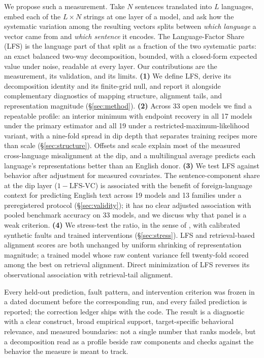 \documentclass{article} %
\begin{document}
We propose such a measurement. Take $N$ sentences translated into $L$
languages, embed each of the $L \times N$ strings at one layer of a model, and
ask how the systematic variation among the resulting vectors splits between
\emph{which language} a vector came from and \emph{which sentence} it encodes.
The Language-Factor Share (LFS) is the language part of that split as a
fraction of the two systematic parts: an exact balanced two-way decomposition,
bounded, with a closed-form expected value under noise, readable at every layer.
Our contributions are the measurement, its validation, and its limits.
\textbf{(1)} We define LFS, derive its decomposition identity and its finite-grid null, and report it alongside complementary diagnostics of mapping structure, alignment tails, and representation magnitude (\S\ref{sec:method}).
\textbf{(2)} Across 33 open models we find a repeatable profile: an interior
minimum with endpoint recovery in all 17 models under the primary estimator
and all 19 under a restricted-maximum-likelihood variant, with a nine-fold
spread in dip depth that separates training recipes more than scale
(\S\ref{sec:structure}). Offsets and scale explain most of the measured cross-language
misalignment at the dip, and a multilingual average predicts each language's
representations better than an English donor.
\textbf{(3)} We test LFS against behavior after adjustment for measured
covariates. The sentence-component share at the dip layer
($1-\mathrm{LFS\text{-}VC}$) is associated with the benefit of
foreign-language context for predicting English text across 19 models and 13
families under a preregistered protocol (\S\ref{sec:validity}); it has no
clear adjusted association with pooled benchmark accuracy on 33 models, and we
discuss why that panel is a weak criterion.
\textbf{(4)} We stress-test the ratio, in the sense of \citet{naik2018stress}, with calibrated synthetic faults and
trained interventions (\S\ref{sec:stress}). LFS and retrieval-based
alignment scores are both unchanged by uniform shrinking of representation
magnitude; a trained model whose raw content variance fell twenty-fold scored
among the best on retrieval alignment. Direct minimization of LFS reverses its observational association with retrieval-tail alignment.

Every held-out prediction, fault pattern, and intervention criterion was frozen in a dated document before the corresponding run, and every failed prediction is reported; the correction ledger ships with the code. The result is a diagnostic with a clear construct, broad empirical support, target-specific behavioral relevance, and measured boundaries: not a single number that ranks models, but a decomposition read as a profile beside raw components and checks against the behavior the measure is meant to track.
\end{document}

